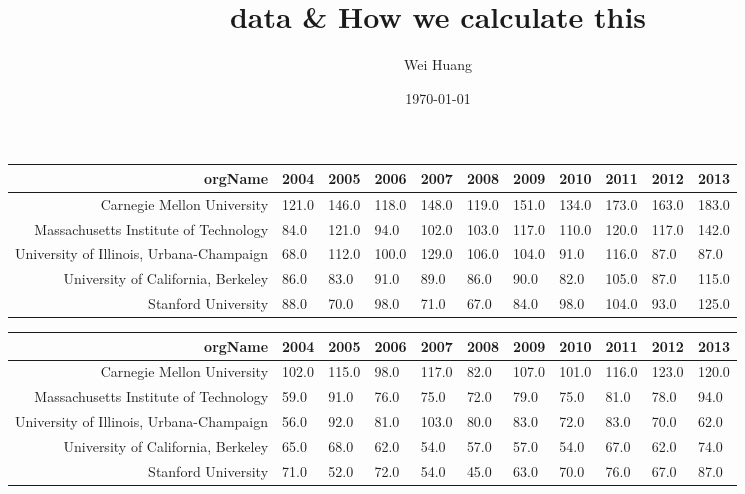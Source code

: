 \documentclass[11pt, oneside]{article}   	%
\title{data \& How we calculate this}
\author{Wei Huang}
\date{\today}							%
\begin{document}

\begin{tabular}{|r|l|l|l|l|l|l|l|l|l|l|}\hline
orgName & 2004 & 2005 & 2006 & 2007 & 2008 & 2009 & 2010 & 2011 & 2012 & 2013\\\hline
Carnegie Mellon University & 121.0 & 146.0 & 118.0 & 148.0 & 119.0 & 151.0 & 134.0 & 173.0 & 163.0 & 183.0 \\\hline 
Massachusetts Institute of Technology & 84.0 & 121.0 & 94.0 & 102.0 & 103.0 & 117.0 & 110.0 & 120.0 & 117.0 & 142.0 \\\hline 
University of Illinois, Urbana-Champaign & 68.0 & 112.0 & 100.0 & 129.0 & 106.0 & 104.0 & 91.0 & 116.0 & 87.0 & 87.0 \\\hline 
University of California, Berkeley & 86.0 & 83.0 & 91.0 & 89.0 & 86.0 & 90.0 & 82.0 & 105.0 & 87.0 & 115.0 \\\hline 
Stanford University & 88.0 & 70.0 & 98.0 & 71.0 & 67.0 & 84.0 & 98.0 & 104.0 & 93.0 & 125.0 \\\hline 
\end{tabular}


\begin{tabular}{|r|l|l|l|l|l|l|l|l|l|l|}\hline
orgName & 2004 & 2005 & 2006 & 2007 & 2008 & 2009 & 2010 & 2011 & 2012 & 2013\\\hline
Carnegie Mellon University & 102.0 & 115.0 & 98.0 & 117.0 & 82.0 & 107.0 & 101.0 & 116.0 & 123.0 & 120.0 \\\hline 
Massachusetts Institute of Technology & 59.0 & 91.0 & 76.0 & 75.0 & 72.0 & 79.0 & 75.0 & 81.0 & 78.0 & 94.0 \\\hline 
University of Illinois, Urbana-Champaign & 56.0 & 92.0 & 81.0 & 103.0 & 80.0 & 83.0 & 72.0 & 83.0 & 70.0 & 62.0 \\\hline 
University of California, Berkeley & 65.0 & 68.0 & 62.0 & 54.0 & 57.0 & 57.0 & 54.0 & 67.0 & 62.0 & 74.0 \\\hline 
Stanford University & 71.0 & 52.0 & 72.0 & 54.0 & 45.0 & 63.0 & 70.0 & 76.0 & 67.0 & 87.0 \\\hline 
\end{tabular}
\end{document}
